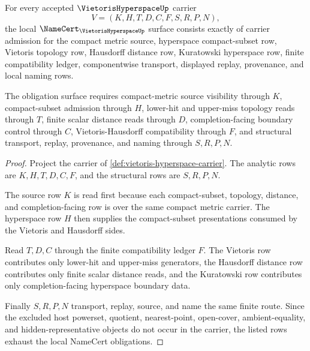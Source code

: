 \begin{theorem}
\label{thm:vietoris-hyperspace-namecert-obligations}
For every accepted $\VietorisHyperspaceUp$ carrier
$$
V=(K,H,T,D,C,F,S,R,P,N),
$$
the local $\NameCert_{\VietorisHyperspaceUp}$ surface consists exactly of carrier admission for the compact metric source, hyperspace compact-subset row, Vietoris topology row, Hausdorff distance row, Kuratowski hyperspace row, finite compatibility ledger, componentwise transport, displayed replay, provenance, and local naming rows.

The obligation surface requires compact-metric source visibility through $K$, compact-subset admission through $H$, lower-hit and upper-miss topology reads through $T$, finite scalar distance reads through $D$, completion-facing boundary control through $C$, Vietoris-Hausdorff compatibility through $F$, and structural transport, replay, provenance, and naming through $S,R,P,N$.
\end{theorem}
\begin{proof}
Project the carrier of \autoref{def:vietoris-hyperspace-carrier}. The analytic rows are $K,H,T,D,C,F$, and the structural rows are $S,R,P,N$.

The source row $K$ is read first because each compact-subset, topology, distance, and completion-facing row is over the same compact metric carrier. The hyperspace row $H$ then supplies the compact-subset presentations consumed by the Vietoris and Hausdorff sides.

Read $T,D,C$ through the finite compatibility ledger $F$. The Vietoris row contributes only lower-hit and upper-miss generators, the Hausdorff distance row contributes only finite scalar distance reads, and the Kuratowski row contributes only completion-facing hyperspace boundary data.

Finally $S,R,P,N$ transport, replay, source, and name the same finite route. Since the excluded host powerset, quotient, nearest-point, open-cover, ambient-equality, and hidden-representative objects do not occur in the carrier, the listed rows exhaust the local NameCert obligations.
\end{proof}

